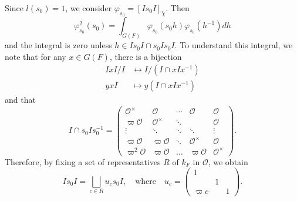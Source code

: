 \documentclass{article}
\newcommand{\cO}{\mathcal{O}}
\theoremstyle{plain}
\theoremstyle{definition}
\begin{document}
    Since $l(s_0)=1$, we consider $\varphi_{s_0}=[Is_0I]_{\check{\chi}}$. Then
    $$\varphi_{s_0}^2(s_0)=\int_{G(F)}\varphi_{s_0}(s_0h)\varphi_{s_0}(h^{-1})dh$$
    and the integral is zero unless $h\in Is_0I\cap s_0Is_0I$. To understand this integral, we note that for any $x\in G(F)$, there is a bijection
    \begin{align*}
        IxI/I&\longleftrightarrow I/(I\cap xIx^{-1})\\
        yxI&\longmapsto y(I\cap xIx^{-1})
    \end{align*}
    and that 
    \begin{equation*}
        I\cap s_0Is_0^{-1}=\begin{pmatrix}
            \cO^\times & \cO & \cdots & \cO & \cO\\
            \varpi\cO & \cO^\times & \ddots &  & \cO\\
            \vdots &\ddots & \ddots & \ddots & \vdots \\
            \varpi\cO & \varpi\cO & \ddots & \cO^\times & \cO\\
            \varpi^2\cO & \varpi\cO & \ldots & \varpi\cO & \cO^\times
        \end{pmatrix}.
    \end{equation*}
    Therefore, by fixing a set of representatives $R$ of $k_F$ in $\cO$, we obtain
    \begin{equation*}
        Is_0I=\bigsqcup_{c\in R} u_cs_0I,\quad\text{where}\quad u_c=
        \begin{pmatrix}
            1 & & \\
            & 1 & \\
            \varpi c & & 1
        \end{pmatrix}.
    \end{equation*}
\end{document}
